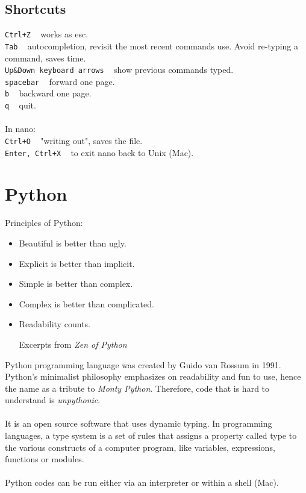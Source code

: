 \documentclass{article}
\begin{document}
\subsection{Shortcuts}
\texttt{Ctrl+Z} ~ works as esc.\\
\texttt{Tab}	 ~	autocompletion, revisit the most recent commands use. Avoid re-typing a command, saves time.\\
\texttt{Up\&Down keyboard arrows} ~ show previous commands typed.\\
\texttt{spacebar} ~	forward one page.\\
\texttt{b} ~	 backward one page.\\
\texttt{q} ~	 quit.\\
\\
In nano:\\
\indent
\texttt{Ctrl+O} ~ "writing out", saves the file. \\
\indent
\texttt{Enter, Ctrl+X} ~ to exit nano back to Unix (Mac).\\

\newpage
\section{Python}


Principles of Python:
\begin{itemize}
\item[]Beautiful is better than ugly.
\item[]Explicit is better than implicit.
\item[]Simple is better than complex.
\item[]Complex is better than complicated.
\item[]Readability counts.

\hfill Excerpts from \textit{Zen of Python} 
\end{itemize}

Python programming language was created by Guido van Rossum in 1991. Python's minimalist philosophy emphasizes on readability and fun to use, hence the name as a tribute to \textit{Monty Python}. Therefore, code that is hard to understand is \textit{unpythonic}.\\
\\
 It is an open source software that uses dynamic typing. In programming languages, a type system is a set of rules that assigns a property called type to the various constructs of a computer program, like variables, expressions, functions or modules. \\
\\
 Python codes can be run either via an interpreter or within a shell (Mac).
\end{document}
